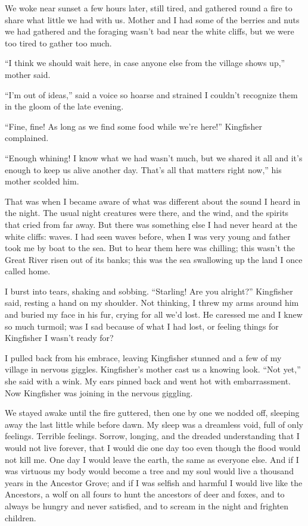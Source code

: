We woke near sunset a few hours later, still tired, and gathered round a fire to share what little we had with us. Mother and I had some of the berries and nuts we had gathered and the foraging wasn't bad near the white cliffs, but we were too tired to gather too much.

``I think we should wait here, in case anyone else from the village shows up,'' mother said.

``I'm out of ideas,'' said a voice so hoarse and strained I couldn't recognize them in the gloom of the late evening.

``Fine, fine! As long as we find some food while we're here!'' Kingfisher complained.

``Enough whining! I know what we had wasn't much, but we shared it all and it's enough to keep us alive another day. That's all that matters right now,'' his mother scolded him.

That was when I became aware of what was different about the sound I heard in the night. The usual night creatures were there, and the wind, and the spirits that cried from far away. But there was something else I had never heard at the white cliffs: waves. I had seen waves before, when I was very young and father took me by boat to the sea. But to hear them here was chilling; this wasn't the Great River risen out of its banks; this was the sea swallowing up the land I once called home.

I burst into tears, shaking and sobbing. ``Starling! Are you alright?'' Kingfisher said, resting a hand on my shoulder. Not thinking, I threw my arms around him and buried my face in his fur, crying for all we'd lost. He caressed me and I knew so much turmoil; was I sad because of what I had lost, or feeling things for Kingfisher I wasn't ready for?

I pulled back from his embrace, leaving Kingfisher stunned and a few of my village in nervous giggles. Kingfisher's mother cast us a knowing look. ``Not yet,'' she said with a wink. My ears pinned back and went hot with embarrassment. Now Kingfisher was joining in the nervous giggling.

We stayed awake until the fire guttered, then one by one we nodded off, sleeping away the last little while before dawn. My sleep was a dreamless void, full of only feelings. Terrible feelings. Sorrow, longing, and the dreaded understanding that I would not live forever, that I would die one day too even though the flood would not kill me. One day I would leave the earth, the same as everyone else. And if I was virtuous my body would become a tree and my soul would live a thousand years in the Ancestor Grove; and if I was selfish and harmful I would live like the Ancestors, a wolf on all fours to hunt the ancestors of deer and foxes, and to always be hungry and never satisfied, and to scream in the night and frighten children.

